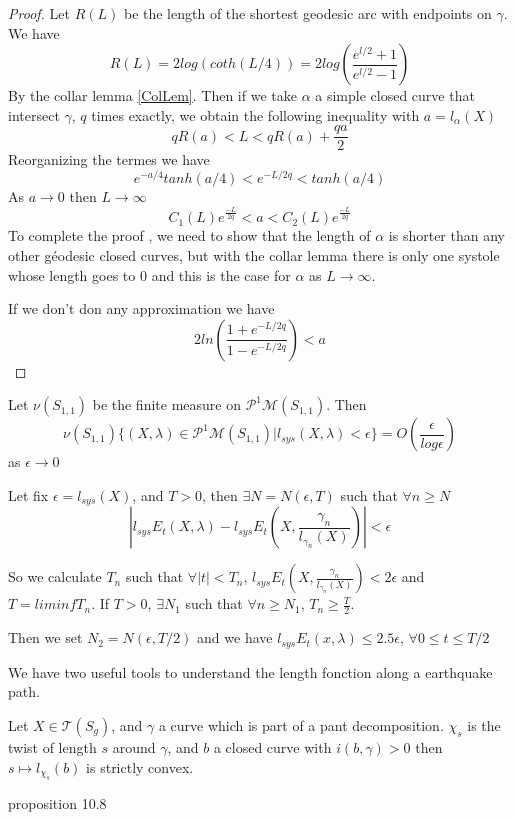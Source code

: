 \begin{proof}
Let $R(L)$ be the length of the shortest geodesic arc with endpoints on $\gamma$. We have \[
R(L)= 2 log(coth(L/4))=2 log(\frac{e^{l/2}+1}{e^{l/2}-1})
\]
By the collar lemma \ref{ColLem}.
Then if we take $\alpha$ a simple closed curve that intersect $\gamma$, $q$ times exactly, we obtain the following inequality with $a=l_\alpha(X)$ \[
q R(a) < L < q R(a) + \frac{qa}{2}
\]
Reorganizing the termes we have \[
e^{-a/4}tanh(a/4) < e^{-L/2q} < tanh(a/4)
\]
As $a \rightarrow 0$ then $L \rightarrow \infty$
\[
C_1(L) e^{\frac{-L}{2q}} < a < C_2(L) e^{\frac{-L}{2q}}
\]
To complete the proof , we need to show that the length of $\alpha$ is shorter than any other géodesic closed curves, but with the collar lemma there is only one systole whose length goes to $0$ and this is the case for $\alpha$ as $L \rightarrow \infty$.

If we don't don any approximation we have \[
2 ln(\frac{1+e^{-L/2q}}{1-e^{-L/2q}}) < a
\]

\end{proof}

\begin{thm} Let $\nu(S_{1,1})$ be the finite measure on $\mathcal{P}^1 \mathcal{M}(S_{1,1})$. Then \[
\nu(S_{1,1})\{ (X,\lambda) \in \mathcal{P}^1 \mathcal{M}(S_{1,1}) | l_{sys}(X,\lambda) < \epsilon \} = O(\frac{\epsilon}{log \epsilon})
\] as $\epsilon \rightarrow 0 $
\end{thm}

\hrulefill

Let fix $\epsilon=l_{sys}(X)$, and $T > 0 $, then $\exists N=N(\epsilon,T)$ such that $\forall n \geq N$ \[
| l_{sys}E_t(X,\lambda)-l_{sys}E_t(X,\frac{\gamma_n}{l_{\gamma_n}(X)})| < \epsilon
\]

So we calculate $T_n$ such that $\forall |t| < T_n$,
 $l_{sys}E_t(X,\frac{\gamma_n}{l_{\gamma_n}(X)}) < 2 \epsilon$
and $T=liminf T_n$. If $T>0$, $\exists N_1$ such that $\forall n \geq N_1$, $T_n \geq \frac{T}{2}$.

Then we set $N_2=N(\epsilon,T/2)$ and we have $l_{sys}E_t(x,\lambda) \leq 2.5 \epsilon $, $\forall 0 \leq t \leq T/2$


\hrulefill

We have two useful tools to understand the length fonction along a earthquake path.

\begin{lem}
Let $X \in \mathcal{T}(S_g)$, and $\gamma$ a curve which is part of a pant decomposition.
 $\chi_s$
  is the twist of length $s$ around $\gamma$, and $b$ a closed curve with $i(b,\gamma) > 0$ then $s \mapsto l_{\chi_s}(b)$ is strictly convex.
\end{lem}
\cite{farb2011primer} proposition 10.8

